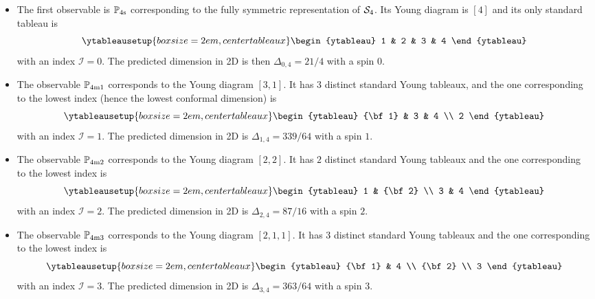 \documentclass[aps,prl,twocolumn,showpacs,superscriptaddress,groupedaddress]{revtex4}  %
\begin{document}
\begin{itemize}
 \item The first observable is $\mathbb P_{\rm 4s}$ corresponding to the fully symmetric representation of ${\cal S}_4$. Its Young diagram is $[4]$ and its only standard tableau is 
\begin{equation}
\ytableausetup{boxsize=2em,centertableaux}
\begin{ytableau}
 1 & 2 & 3 & 4
\end{ytableau}
\end{equation}
with an index $\mathcal{I}=0$. The predicted dimension in 2D is then $\Delta_{0,4}=21/4$ with a spin $0$.

 \item The observable $\mathbb P_{\rm 4m1}$ corresponds to the Young diagram $[3,1]$. It has $3$ distinct standard Young tableaux, and the one corresponding to the lowest index (hence the lowest conformal dimension) is
\begin{equation}
\ytableausetup{boxsize=2em,centertableaux}
\begin{ytableau}
 {\bf 1} & 3 & 4 \\
 2
\end{ytableau}
\end{equation}
with an index $\mathcal{I}=1$. The predicted dimension in 2D is $\Delta_{1,4}=339/64$ with a spin $1$.

\item The observable $\mathbb P_{\rm 4m2}$ corresponds to the Young diagram $[2,2]$. It has $2$ distinct standard Young tableaux and the one corresponding to the lowest index is
\begin{equation}
\ytableausetup{boxsize=2em,centertableaux}
\begin{ytableau}
 1 & {\bf 2}  \\
 3 & 4
\end{ytableau}
\end{equation}
with an index $\mathcal{I}=2$. The predicted dimension in 2D is $\Delta_{2,4}=87/16$ with a spin $2$.

\item The observable $\mathbb P_{\rm 4m3}$ corresponds to the Young diagram $[2,1,1]$. It has $3$ distinct standard Young tableaux and the one corresponding to the lowest index is
\begin{equation}
\ytableausetup{boxsize=2em,centertableaux}
\begin{ytableau}
 {\bf 1} & 4  \\
 {\bf 2} \\
 3
\end{ytableau}
\end{equation}
with an index $\mathcal{I}=3$. The predicted dimension in 2D is $\Delta_{3,4}=363/64$ with a spin $3$.


\end{itemize}
\end{document}
